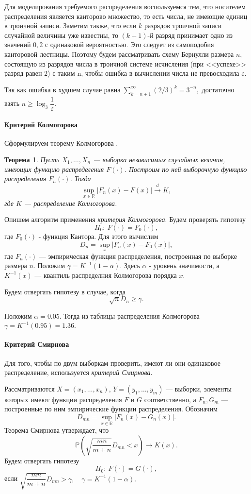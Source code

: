 \documentclass[16pt]{article}
\newtheorem{Th}{Теорема}
\newcommand\Real{\mathbb{R}}
\newcommand\A{(\cdot)}
\begin{document}
Для моделирования требуемого распределения воспользуемся тем, что носителем распределения является канторово множество, то есть числа, не имеющие единиц в троичной записи. Заметим также, что если $k$ разрядов троичной записи случайной величины уже известны, то $(k+1)$-й разряд принимает одно из значений $0, 2$ с одинаковой вероятностью. Это следует из самоподобия канторовой лестницы. Поэтому будем рассматривать схему Бернулли размера $n$, состоящую из разрядов числа в троичной системе исчисления (при <<успехе>> разряд равен 2) с таким n, чтобы ошибка в вычислении числа не превосходила $\varepsilon$.

Так как ошибка в худшем случае равна
$ \sum\limits_{k=n+1}^\infty\left(2/3\right)^{k} = 3^{-n},$
достаточно взять $n \geq \log_3 \dfrac{1}{\varepsilon}$.

\paragraph{Критерий Колмогорова}
Сформулируем теорему Колмогорова \cite{Kolm}. 
\begin{Th}
Пусть $X_1, \ldots, X_n$ --- выборка независимых случайных величин, имеющих функцию распределения $F\A$. Построим по ней выборочную функцию распределения $F_n\A$. Тогда $$\sup_{x \in \Real}|F_n(x) - F(x)| \overset{d}{\to} K,$$
где $K$ --- распределение Колмогорова.
\end{Th}

Опишем алгоритм применения {\it критерия Колмогорова}. Будем проверять гипотезу
$$H_0\colon \ F(\cdot) = F_0(\cdot),$$
где $F_0(\cdot)$ - функция Кантора. Для этого вычислим
$$D_n = \sup_x|F_n(x) - F_0(x)|,$$
где $F_n(\cdot)$ --- эмпирическая функция распределения, построенная по выборке размера $n$. Положим $\gamma = K^{-1}(1-\alpha)$. Здесь $\alpha$ - уровень значимости, а $K^{-1}(x)$ --- квантиль распределния Колмогорова порядка $x$. 

Будем отвергать гипотезу в случае, когда
$$\sqrt{n}D_n \geq \gamma.$$

Положим $\alpha = 0.05$. Тогда из таблицы распределения Колмогорова $\gamma = K^{-1}(0.95) = 1.36$.

\paragraph{Критерий Смирнова} Для того, чтобы по двум выборкам проверить, имеют ли они одинаковое распределение, используется {\it критерий Смирнова}. 

Рассматриваются $X = (x_1, \ldots, x_n),\, Y = (y_1, \ldots, y_m)$ --- выборки, элементы которых имеют функции распределения $F$ и $G$ соответственно, а $F_n, G_m$ --- построенные по ним эмпирические функции распределения. Обозначим 
$$D_{mn} = \sup_{x \in \mathbb{R}}|F_n(x) - G_n(x)|.$$
Теорема Смирнова \cite{Smir} утверждает, что
$$\mathbb{P}\left(\sqrt{\frac{mn}{m+n}}D_{mn} < x\right) \to K(x).$$
Будем отвергать гипотезу
$$H_0\colon \ F(\cdot) = G(\cdot),$$
если 
$\sqrt{\dfrac{mn}{m+n}}D_{mn} > \gamma, \quad \gamma = K^{-1}(1 - \alpha).$
\end{document}
